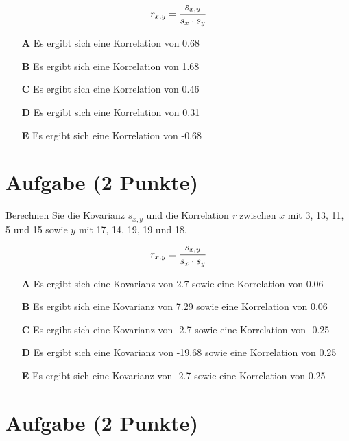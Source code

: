 \documentclass[a4paper, 10pt]{scrartcl}\usepackage[]{graphicx}\usepackage[]{color}
\begin{document}
\begin{equation*}
  r_{x,y} = \cfrac{s_{x,y}}{s_x \cdot s_y}
\end{equation*}



\begin{enumerate}
\item [\textbf{A} \msquare] Es ergibt sich eine Korrelation von 0.68
\item [\textbf{B} \msquare] Es ergibt sich eine Korrelation von 1.68
\item [\textbf{C} \msquare] Es ergibt sich eine Korrelation von 0.46
\item [\textbf{D} \msquare] Es ergibt sich eine Korrelation von 0.31
\item [\textbf{E} \msquare] Es ergibt sich eine Korrelation von -0.68
\end{enumerate} 

\section{Aufgabe \hfill (2 Punkte)}




Berechnen Sie die Kovarianz $s_{x,y}$ und die Korrelation
\textit{r} zwischen $x$ mit 3, 13, 11, 5 und 15 sowie $y$ mit 17, 14, 19, 19 und 18.
\begin{equation*}
  r_{x,y} = \cfrac{s_{x,y}}{s_x \cdot s_y}
\end{equation*}



\begin{enumerate}
\item [\textbf{A} \msquare] Es ergibt sich eine Kovarianz von 2.7 sowie eine Korrelation von 0.06
\item [\textbf{B} \msquare] Es ergibt sich eine Kovarianz von 7.29 sowie eine Korrelation von 0.06
\item [\textbf{C} \msquare] Es ergibt sich eine Kovarianz von -2.7 sowie eine Korrelation von -0.25
\item [\textbf{D} \msquare] Es ergibt sich eine Kovarianz von -19.68 sowie eine Korrelation von 0.25
\item [\textbf{E} \msquare] Es ergibt sich eine Kovarianz von -2.7 sowie eine Korrelation von 0.25
\end{enumerate} 

\section{Aufgabe \hfill (2 Punkte)}
\end{document}
